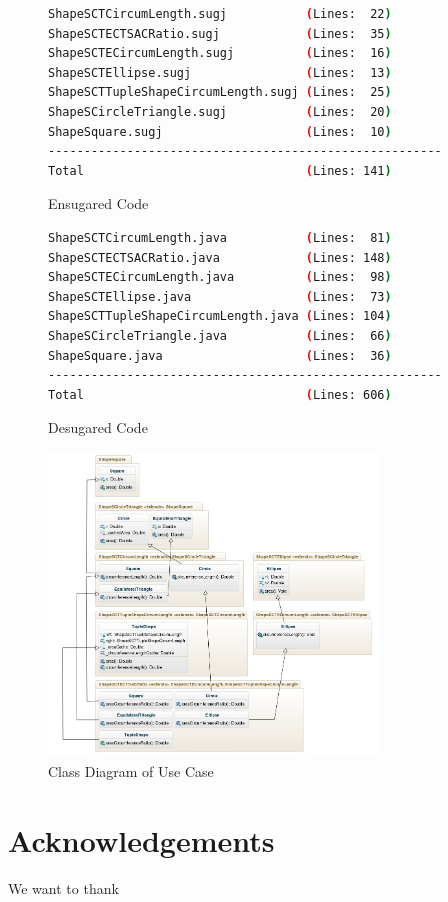 \documentclass{report}
\begin{document}
\begin{figure}[h]
\begin{lstlisting}[language=bash,numbers=none]
ShapeSCTCircumLength.sugj           (Lines:  22)
ShapeSCTECTSACRatio.sugj            (Lines:  35)
ShapeSCTECircumLength.sugj          (Lines:  16)
ShapeSCTEllipse.sugj                (Lines:  13)
ShapeSCTTupleShapeCircumLength.sugj (Lines:  25)
ShapeSCircleTriangle.sugj           (Lines:  20)
ShapeSquare.sugj                    (Lines:  10)
-------------------------------------------------------
Total                               (Lines: 141)
\end{lstlisting}
\caption{Ensugared Code}
\end{figure}

\begin{figure}[h]
\begin{lstlisting}[language=bash,numbers=none]
ShapeSCTCircumLength.java           (Lines:  81)
ShapeSCTECTSACRatio.java            (Lines: 148)
ShapeSCTECircumLength.java          (Lines:  98)
ShapeSCTEllipse.java                (Lines:  73)
ShapeSCTTupleShapeCircumLength.java (Lines: 104)
ShapeSCircleTriangle.java           (Lines:  66)
ShapeSquare.java                    (Lines:  36)
-------------------------------------------------------
Total                               (Lines: 606)
\end{lstlisting}
\caption{Desugared Code}
\end{figure}

\begin{figure}[h]
\includegraphics[width=330px,keepaspectratio=true]{Expression_problem-diag2.jpg}
\caption{Class Diagram of Use Case}
\end{figure}


\chapter*{Acknowledgements}
We want to thank 
\begingroup
\renewcommand{\cleardoublepage}{}
\renewcommand{\clearpage}{}




\endgroup
\end{document}
